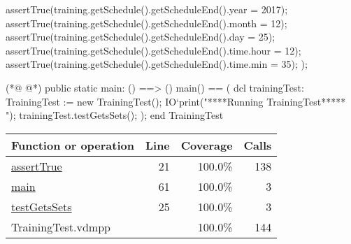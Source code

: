 \begin{vdmpp}[breaklines=true]
   assertTrue(training.getSchedule().getScheduleEnd().year = 2017);
   assertTrue(training.getSchedule().getScheduleEnd().month = 12);
   assertTrue(training.getSchedule().getScheduleEnd().day = 25);
   assertTrue(training.getSchedule().getScheduleEnd().time.hour = 12);
   assertTrue(training.getSchedule().getScheduleEnd().time.min = 35);
  );

(*@
\label{main:61}
@*)
 public static main: () ==> ()
   main() == (
    dcl trainingTest: TrainingTest := new TrainingTest();
    IO`print("\n *****Running TrainingTest***** \n");
    trainingTest.testGetsSets();
   );
end TrainingTest
\end{vdmpp}
\bigskip
\begin{longtable}{|l|r|r|r|}
\hline
Function or operation & Line & Coverage & Calls \\
\hline
\hline
\hyperref[assertTrue:21]{assertTrue} & 21&100.0\% & 138 \\
\hline
\hyperref[main:61]{main} & 61&100.0\% & 3 \\
\hline
\hyperref[testGetsSets:25]{testGetsSets} & 25&100.0\% & 3 \\
\hline
\hline
TrainingTest.vdmpp & & 100.0\% & 144 \\
\hline
\end{longtable}

